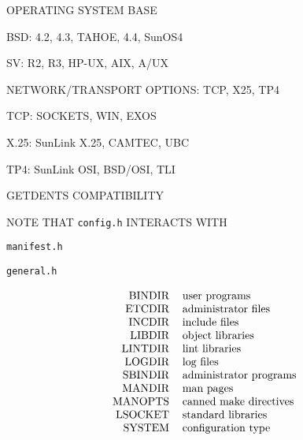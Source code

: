 \begin{bwslide}

\begin{nrtc}
\item	OPERATING SYSTEM BASE
    \begin{nrtc}
    \item	BSD: 4.2, 4.3, TAHOE, 4.4, SunOS4

    \item	SV: R2, R3, HP-UX, AIX, A/UX
    \end{nrtc}

\item	NETWORK/TRANSPORT OPTIONS: TCP, X25, TP4
    \begin{nrtc}
    \item	TCP: SOCKETS, WIN, EXOS

    \item	X.25: SunLink X.25, CAMTEC, UBC

    \item	TP4: SunLink OSI, BSD/OSI, TLI
    \end{nrtc}
\end{nrtc}
\end{bwslide}


\begin{bwslide}

\begin{nrtc}
\item	GETDENTS COMPATIBILITY

\item	NOTE THAT \verb"config.h" INTERACTS WITH
    \begin{nrtc}
    \item	\verb"manifest.h"

    \item	\verb"general.h"
    \end{nrtc}
\end{nrtc}
\end{bwslide}


\begin{bwslide}

\[\begin{tabular}{rl}
BINDIR&		user programs\\
ETCDIR&		administrator files\\
INCDIR&		include files\\
LIBDIR&		object libraries\\
LINTDIR&	 lint libraries\\
LOGDIR&		log files\\
SBINDIR&	 administrator programs\\
MANDIR&		man pages\\
MANOPTS&	canned make directives\\
LSOCKET&	standard libraries\\
SYSTEM&		configuration type
\end{tabular}\]
\end{bwslide}


